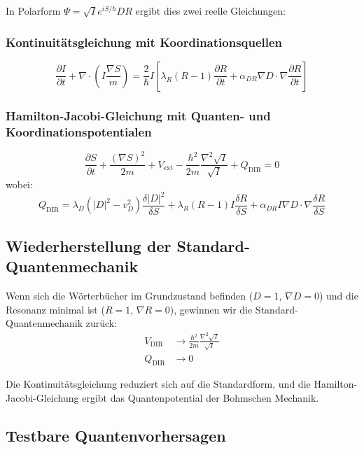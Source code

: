 \documentclass[11pt,a4paper]{article}
\begin{document}
	In Polarform $\Psi = \sqrt{I} e^{iS/\hbar} D R$ ergibt dies zwei reelle Gleichungen:
	
	\subsubsection{Kontinuitätsgleichung mit Koordinationsquellen}
	\begin{equation}
		\frac{\partial I}{\partial t} + \nabla \cdot \left( I \frac{\nabla S}{m} \right) = \frac{2}{\hbar} I \left[ \lambda_R (R-1) \frac{\partial R}{\partial t} + \alpha_{DR} \nabla D \cdot \nabla \frac{\partial R}{\partial t} \right]
	\end{equation}
	
	\subsubsection{Hamilton-Jacobi-Gleichung mit Quanten- und Koordinationspotentialen}
	\begin{equation}
		\frac{\partial S}{\partial t} + \frac{(\nabla S)^2}{2m} + V_{\text{ext}} - \frac{\hbar^2}{2m} \frac{\nabla^2 \sqrt{I}}{\sqrt{I}} + Q_{\text{DIR}} = 0
	\end{equation}
	wobei:
	\begin{equation}
		Q_{\text{DIR}} = \lambda_D (|D|^2 - v_D^2) \frac{\delta |D|^2}{\delta S} 
		+ \lambda_R (R-1) I \frac{\delta R}{\delta S}
		+ \alpha_{DR} I \nabla D \cdot \nabla \frac{\delta R}{\delta S}
	\end{equation}
	
	\subsection{Wiederherstellung der Standard-Quantenmechanik}
	
	Wenn sich die Wörterbücher im Grundzustand befinden ($D = 1$, $\nabla D = 0$) und die Resonanz minimal ist ($R = 1$, $\nabla R = 0$), gewinnen wir die Standard-Quantenmechanik zurück:
	\begin{align}
		V_{\text{DIR}} &\to \frac{\hbar^2}{2m} \frac{\nabla^2 \sqrt{I}}{\sqrt{I}} \\
		Q_{\text{DIR}} &\to 0
	\end{align}
	
	Die Kontinuitätsgleichung reduziert sich auf die Standardform, und die Hamilton-Jacobi-Gleichung ergibt das Quantenpotential der Bohmschen Mechanik.
	
	\subsection{Testbare Quantenvorhersagen}
	
\end{document}
